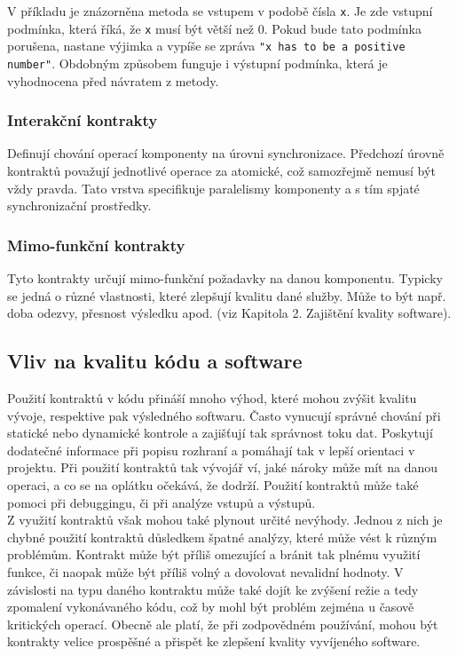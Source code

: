 			V příkladu je znázorněna metoda se vstupem v podobě čísla \texttt{x}. Je zde vstupní podmínka, která říká, že \texttt{x} musí být větší než 0. Pokud bude tato podmínka porušena, nastane výjimka a vypíše se zpráva \texttt{"x has to be a positive number"}. Obdobným způsobem funguje i výstupní podmínka, která je vyhodnocena před návratem z metody.
		
		\subsubsection{Interakční kontrakty}
			Definují chování operací komponenty na úrovni synchronizace. Předchozí úrovně kontraktů považují jednotlivé operace za atomické, což samozřejmě nemusí být vždy pravda. Tato vrstva specifikuje paralelismy komponenty a s tím spjaté synchronizační prostředky.
		
		\subsubsection{Mimo-funkční kontrakty}
			Tyto kontrakty určují mimo-funkční požadavky na danou komponentu. Typicky se jedná o různé vlastnosti, které zlepšují kvalitu dané služby. Může to být např. doba odezvy, přesnost výsledku apod. (viz Kapitola 2. Zajištění kvality software).
		
	\subsection{Vliv na kvalitu kódu a software}
		Použití kontraktů v kódu přináší mnoho výhod, které mohou zvýšit kvalitu vývoje, respektive pak výsledného softwaru. Často vynucují správné chování při statické nebo dynamické kontrole a zajišťují tak správnost toku dat. Poskytují dodatečné informace při popisu rozhraní a pomáhají tak v lepší orientaci v projektu. Při použití kontraktů tak vývojář ví, jaké nároky může mít na danou operaci, a co se na oplátku očekává, že dodrží. Použití kontraktů může také pomoci při debuggingu, či při analýze vstupů a výstupů.\\
		
		Z využití kontraktů však mohou také plynout určité nevýhody. Jednou z nich je chybné použití kontraktů důsledkem špatné analýzy, které může vést k různým problémům. Kontrakt  může být příliš omezující a bránit tak plnému využití funkce, či naopak může být příliš volný a dovolovat nevalidní hodnoty. V závislosti na typu daného kontraktu může také dojít ke zvýšení režie a tedy zpomalení vykonávaného kódu, což by mohl být problém zejména u časově kritických operací. Obecně ale platí, že při zodpovědném používání, mohou být kontrakty velice prospěšné a přispět ke zlepšení kvality vyvíjeného software.


